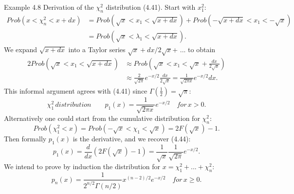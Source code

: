 	Example 4.8 Derivation of the $\chi^2_n$ distribution (4.41). Start with $x^2_1$:
	\begin{equation*}	
	\begin{split}
	Prob(x<\chi^2_n<x+dx)&= Prob(\sqrt{x}<x_1<\sqrt{x+dx})+Prob(-\sqrt{x+dx}<x_1<-\sqrt{x})\\
	&=Prob(\sqrt{x}<\lambda_1<\sqrt{x+dx}).
	\end{split}
	\end{equation*}
	We expand $\sqrt{x+dx}$ into a Taylor series $\sqrt{x}+dx/2\sqrt{x}$+ ... to obtain
	\begin{equation*}	
	\begin{split}
	2Prob(\sqrt{x}<x_1<\sqrt{x+dx})&\approx Prob(\sqrt{x}<x_1<\sqrt{x}+\frac{dx}{2\sqrt{x}})\\
	&\approx \frac{2}{\sqrt{2\pi}}e^{-x/2}\frac{dx}{2\sqrt{x}}=\frac{1}{\sqrt{2\pi x}}e^{-x/2}dx.
	\end{split}
	\end{equation*}
	This informal argument agrees with (4.41) since $\Gamma (\frac{1}{2})=\sqrt{\pi}$:
	\begin{equation}
	\chi^2_1\,distribution \qquad p_1(x)=\frac{1}{\sqrt{2\pi x}}e^{-x/2} \quad for\,x>0.
	\end{equation}
	Alternatively one could start from the cumulative distribution for $\chi^2_n$:
	\begin{equation*}
	Prob(\chi^2_1<x)= Prob(-\sqrt{x}<\chi_1<\sqrt{x})=2F(\sqrt{x})-1.
	\end{equation*}
	Then formally $p_1(x)$ is the derivative, and we recover (4.44):
	\begin{equation*}
	p_1(x)=\frac{d}{dx}(2F(\sqrt{x})-1)=\frac{1}{\sqrt{x}}\frac{1}{\sqrt{2\pi}}e^{-x/2}.
	\end{equation*}
	We intend to prove by induction the distribution for $x=\chi^2_1+ ... +\chi^2_n$:
	\begin{equation}
	p_n(x)=\frac{1}{2^{n/2}\Gamma (n/2)}x^{(n-2)/2}e^{-x/2} \quad for\,x\geq 0.
	\end{equation}
	
